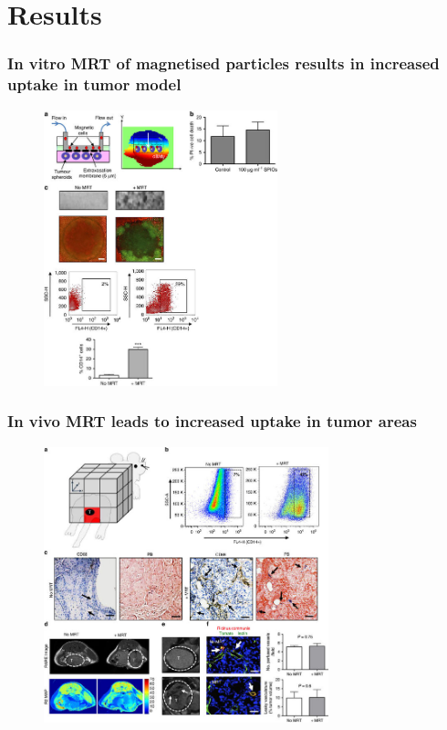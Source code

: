 \documentclass[8pt,xcolor=table]{beamer}
\begin{document}
\section{Results}

\begin{frame}
\frametitle{In vitro MRT of magnetised particles results in increased uptake in tumor model}
 \begin{figure}
 \centering
 \includegraphics[height=8cm]{muthana_invitro_res}
 \end{figure} 
\end{frame}

\begin{frame}
\frametitle{In vivo MRT leads to increased uptake in tumor areas}
 \begin{figure}
 \centering
 \includegraphics[height=8cm]{muthana_fig2_res}
 \end{figure} 
 
 
\end{frame}
\end{document}
